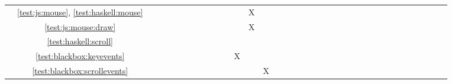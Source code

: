 \begin{tabular}{cc|c|c|c|c|c|c|c|c|c|c|c|c|c|c|c|c|c|c|c|c|c|c|c|c|c|c|c|c|c|c|c|c|c|c|}
\multicolumn{1}{|c|}{} & \ref{test:js:mouse}, \ref{test:haskell:mouse}					&   &   &   &   &   &   &   &   &   &   &   & X &   &   &   &   &   &   &   &   &   &   &   &   &   &   &   &   		 \\ \cline{2-30}
\multicolumn{1}{|c|}{} & \ref{test:js:mouse:draw} 										&   &   &   &   &   &   &   &   &   &   &   & X &   &   &   &   &   &   &   &   &   &   &   &   &   &   &   &   		 \\ \cline{2-30}
\multicolumn{1}{|c|}{} & \ref{test:haskell:scroll} 										&   &   &   &   &   &   &   &   &   &   &   &   &   &   &   &   &   &   &   &   &   &   &   &   &   &   &   &   		 \\ \cline{2-30}

\multicolumn{1}{|c|}{} & \ref{test:blackbox:keyevents}	 								&   &   &   &   &   &   &   &   &   &   & X &   &   &   &   &   &   &   &   &   &   &   &   &   &   &   &   &   		 \\ \cline{2-30}
\multicolumn{1}{|c|}{} & \ref{test:blackbox:scrollevents}								&   &   &   &   &   &   &   &   &   &   &   &   & X &   &   &   &   &   &   &   &   &   &   &   &   &   &   &   		 \\ \cline{2-30}



\end{tabular}

